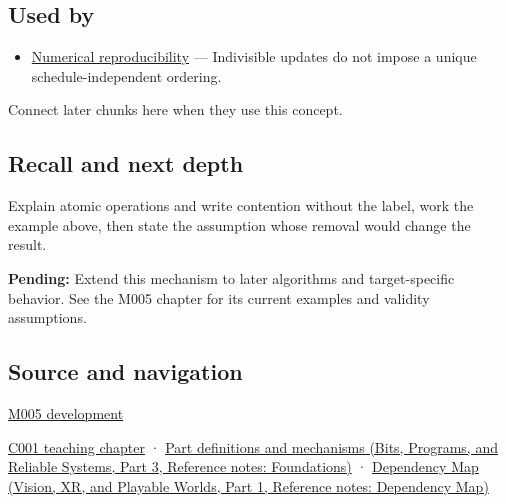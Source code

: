 \subsection{Used by}\label{appendix-e12d1b03fefb-used-by}

\hypertarget{appendix-e12d1b03fefb-used-by}{}

\begin{itemize}
\tightlist
\item
  \hyperref[appendix-5f1a2c3f97ff]{Numerical reproducibility} --- Indivisible updates do not impose a unique schedule-independent ordering.
\end{itemize}

Connect later chunks here when they use this concept.

\subsection{Recall and next depth}\label{appendix-e12d1b03fefb-recall-and-next-depth}

\hypertarget{appendix-e12d1b03fefb-recall-and-next-depth}{}

Explain atomic operations and write contention without the label, work the example above, then state the assumption whose removal would change the result.

\textbf{Pending:} Extend this mechanism to later algorithms and target-specific behavior. See the M005 chapter for its current examples and validity assumptions.

\subsection{Source and navigation}\label{appendix-e12d1b03fefb-source-and-navigation}

\hypertarget{appendix-e12d1b03fefb-source-and-navigation}{}

\hyperref[01-foundations-i-ch001-when-arithmetic-meets-uncertainty]{M005 development}

\hyperref[01-foundations-i-ch001-from-a-signal-to-an-interpretation]{C001 teaching chapter} · \href{../01-Bits-Programs-and-Reliable-Systems-P03/main.pdf\#nameddest=appendix-fd090d982a15}{Part definitions and mechanisms (Bits, Programs, and Reliable Systems, Part 3, Reference notes: Foundations)} · \href{../07-Vision-XR-and-Playable-Worlds-P01/main.pdf\#nameddest=appendix-4ad47bdd269a}{Dependency Map (Vision, XR, and Playable Worlds, Part 1, Reference notes: Dependency Map)}

